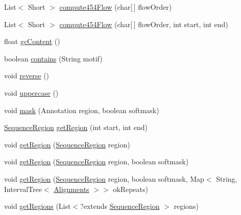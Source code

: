 \begin{DoxyCompactItemize}
List$<$ Short $>$ \hyperlink{classbroad_1_1core_1_1sequence_1_1_sequence_aa07f336c9e608874def5dfb43f089258}{compute454\+Flow} (char\mbox{[}$\,$\mbox{]} flow\+Order)
\item 
List$<$ Short $>$ \hyperlink{classbroad_1_1core_1_1sequence_1_1_sequence_aa57def9ee75307cc2edbf973491b864f}{compute454\+Flow} (char\mbox{[}$\,$\mbox{]} flow\+Order, int start, int end)
\item 
float \hyperlink{classbroad_1_1core_1_1sequence_1_1_sequence_a38dde2f2faa86fc1e71dd44878e8b078}{gc\+Content} ()
\item 
boolean \hyperlink{classbroad_1_1core_1_1sequence_1_1_sequence_a175ad53de415a37d032a20ca3d5370ab}{contains} (String motif)
\item 
void \hyperlink{classbroad_1_1core_1_1sequence_1_1_sequence_ae7dfa608c5c59b4b99721841e1715b84}{reverse} ()
\item 
void \hyperlink{classbroad_1_1core_1_1sequence_1_1_sequence_a50efd0ef4a7b4d79ba3006a180ac9a02}{uppercase} ()
\item 
void \hyperlink{classbroad_1_1core_1_1sequence_1_1_sequence_ab2de5da03cf12144aa625a7bdafdb8fb}{mask} (Annotation region, boolean softmask)
\item 
\hyperlink{classbroad_1_1core_1_1sequence_1_1_sequence_region}{Sequence\+Region} \hyperlink{classbroad_1_1core_1_1sequence_1_1_sequence_adbb50ac29ca32a2b07e56bd995089ecd}{get\+Region} (int start, int end)
\item 
void \hyperlink{classbroad_1_1core_1_1sequence_1_1_sequence_af47fd709eae2167bb6190ded932fdc06}{get\+Region} (\hyperlink{classbroad_1_1core_1_1sequence_1_1_sequence_region}{Sequence\+Region} region)
\item 
void \hyperlink{classbroad_1_1core_1_1sequence_1_1_sequence_a0b1f162c2ca4fafb7ff10dbb09f7a5f2}{get\+Region} (\hyperlink{classbroad_1_1core_1_1sequence_1_1_sequence_region}{Sequence\+Region} region, boolean softmask)
\item 
void \hyperlink{classbroad_1_1core_1_1sequence_1_1_sequence_aedcfb7c619bf8d261062e3005f1b23f8}{get\+Region} (\hyperlink{classbroad_1_1core_1_1sequence_1_1_sequence_region}{Sequence\+Region} region, boolean softmask, Map$<$ String, Interval\+Tree$<$ \hyperlink{classbroad_1_1pda_1_1datastructures_1_1_alignments}{Alignments} $>$$>$ ok\+Repeats)
\item 
void \hyperlink{classbroad_1_1core_1_1sequence_1_1_sequence_a183530d8cd29a589efc7a195e5b6c176}{get\+Regions} (List$<$?extends \hyperlink{classbroad_1_1core_1_1sequence_1_1_sequence_region}{Sequence\+Region} $>$ regions)
$$
\end{DoxyCompactItemize}
